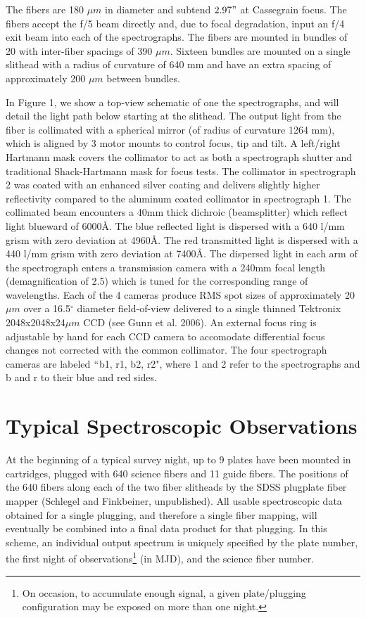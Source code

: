 \documentclass[12pt,preprint]{aastex}
\newcommand{\degree}{^\circ}
\begin{document}
The fibers are 180 $\mu m$ in diameter and subtend $2.97"$ at Cassegrain focus.
The fibers accept the f/5 beam directly and, due to focal degradation, input
an f/4 exit beam into each of the spectrographs.  The fibers are mounted in
bundles of 20 with inter-fiber spacings of 390 $\mu m$.  Sixteen bundles are
mounted on a single slithead with a radius of curvature of 640 mm and have
an extra spacing of approximately 200 $\mu m$ between bundles.

In Figure 1, we show a top-view schematic of one the spectrographs, and
will detail the light path below starting at the slithead.
The output light from the fiber is collimated with a spherical mirror
(of radius of curvature 1264 mm), which is aligned by 3 motor mounts to
control focus, tip and tilt.  A left/right Hartmann mask 
covers the collimator to act as both a spectrograph shutter and traditional 
Shack-Hartmann mask for focus tests.  The collimator in spectrograph 2
was coated with an enhanced silver coating and delivers slightly higher
reflectivity compared to the aluminum coated collimator in spectrograph 1.
The collimated beam encounters a 40mm thick dichroic (beamsplitter) which
reflect light blueward of 6000\AA.  The blue reflected light is dispersed
with a 640 l/mm grism with zero deviation at 4960\AA.  The red transmitted
light is dispersed with a 440 l/mm grism with zero deviation at 7400\AA.
The dispersed light in each arm of the spectrograph enters a transmission camera
with a 240mm focal length (demagnification of 2.5) which is tuned for the 
corresponding range of wavelengths.  Each of the 4 cameras produce RMS 
spot sizes of approximately 20$\mu m$ over a 16.5$\degree$ diameter 
field-of-view delivered to a single thinned Tektronix 2048x2048x24$\mu m$ CCD
(see Gunn et al. 2006).
An external focus ring is adjustable by hand for each CCD camera to accomodate
differential focus changes not corrected with the common collimator.
The four spectrograph cameras are labeled $``$b1, r1, b2, r2", where
1 and 2 refer to the spectrographs and b and r to their blue and red sides.  


\section{Typical Spectroscopic Observations}
\label{sec_observ}

At the beginning of a typical survey night, up to 9 plates have been mounted
in cartridges, plugged with 640 science fibers and 11 guide fibers. 
The positions of the 640 fibers along each of the two fiber slitheads
by 
the SDSS plugplate fiber mapper (Schlegel and Finkbeiner, unpublished).
All usable spectroscopic data obtained for a single plugging, 
and therefore a single fiber mapping, will eventually be combined into 
a final data product for that plugging.  In this scheme, an individual 
output spectrum is uniquely specified by the plate number, the first night
of observations\footnote{On occasion, to accumulate enough signal, a given
plate/plugging configuration may be exposed on more than one night.} (in MJD), 
and the science fiber number.
\end{document}
